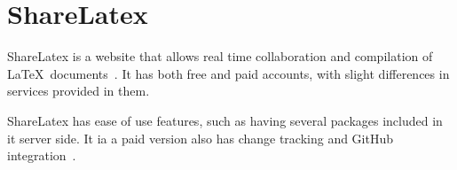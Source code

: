 \section{ShareLatex}

ShareLatex is a website that allows real time collaboration and compilation
of \LaTeX~documents~\cite{www-hid-sp18-601-slatex-documentation}. It has both 
free and paid accounts, with slight differences
 in services provided in them.
 
ShareLatex has ease of use features, such as having several packages included 
in it server side. It ia a paid version also has change tracking and GitHub
integration~\cite{www-hid-sp18-601-slatex-plans}.